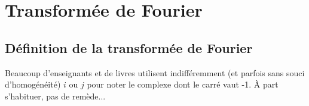 

\chapter{Transformée de Fourier}


%





\section{Définition de la transformée de Fourier}

\begin{remark}

Beaucoup d'enseignants et de livres utilisent indifféremment (et
parfois sans souci d'homogénéité) $i$ ou $j$ pour noter le complexe
dont le carré vaut -1. \`A part s'habituer, pas de remède...

\end{remark}

